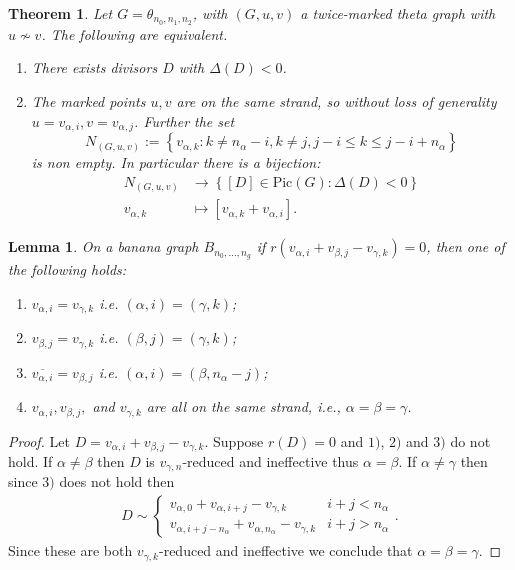 \documentclass[11pt]{article}
\newtheorem{theorem}[theo]{Theorem}
\newtheorem{lemma}[theo]{Lemma}
\theoremstyle{definition}
\numberwithin{equation}{section}
\newcommand{\pic}[1]{\mathrm{Pic}\left({#1}\right)}
\newcommand{\set}[1]{\left\{{#1}\right\}}
\begin{document}
\begin{theorem}\label{thm-NonSubmodGenus2}
Let $G = \theta_{n_0,n_1,n_2}$, with $(G,u,v)$ a twice-marked theta graph with $u\not \sim v$. The following are equivalent.
\begin{enumerate}[label = \arabic*)]
    \item There exists divisors $D$ with $\Delta(D)<0$.
    \item The marked points $u,v$ are on the same strand, so without loss of generality $u = v_{\alpha,i},v = v_{\alpha,j}$. Further the set
    $$N_{(G,u,v)} := \set{v_{\alpha,k}:k \neq n_\alpha -i, k \neq j, j-i\leq k \leq j-i+n_\alpha}$$ is non empty. In particular there is a bijection:
    \begin{align*}
        N_{(G,u,v)} &\to \set{[D]\in\pic{G}:\Delta(D)<0}\\
        v_{\alpha,k} & \mapsto [v_{\alpha,k}+v_{\alpha,i}].
    \end{align*}
\end{enumerate}
\end{theorem}




\begin{lemma}\label{lem-SameStrand}
    On a banana graph $B_{n_0,\dots,n_g}$ if $r(v_{\alpha,i}+v_{\beta,j}-v_{\gamma,k}) = 0$, then one of the following holds:
    \begin{enumerate}[label = \arabic*)]
        \item $v_{\alpha,i} = v_{\gamma,k}$ i.e. $(\alpha,i) = (\gamma,k)$;
        \item $v_{\beta,j} = v_{\gamma,k}$ i.e. $(\beta,j) = (\gamma,k)$;
        \item $\overline{v_{\alpha,i}} = v_{\beta,j}$ i.e. $(\alpha,i) = (\beta,n_\alpha-j)$;
        \item $v_{\alpha,i},v_{\beta,j},$ and $v_{\gamma,k}$ are all on the same strand, i.e., $\alpha = \beta = \gamma$.
    \end{enumerate}
\end{lemma}

\begin{proof}
    Let $D = v_{\alpha,i}+v_{\beta,j}-v_{\gamma,k}$. Suppose $r(D) = 0$ and $1)$, $2)$ and $3)$ do not hold. If $\alpha \neq \beta$ then $D$ is $v_{\gamma,n}$-reduced and ineffective thus $\alpha = \beta$. If $\alpha \neq \gamma$ then since $3)$ does not hold then
    \begin{align*}
        D \sim \begin{cases}
            v_{\alpha,0}+v_{\alpha,i+j} - v_{\gamma,k} & i + j < n_\alpha\\
            v_{\alpha,i + j - n_\alpha}+v_{\alpha,n_\alpha}-v_{\gamma,k} & i +j > n_\alpha
        \end{cases}.
    \end{align*}
    Since these are both $v_{\gamma,k}$-reduced and ineffective we conclude that $\alpha = \beta = \gamma$.
\end{proof}
\end{document}
